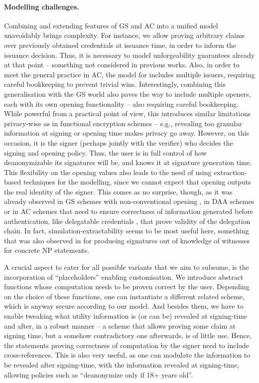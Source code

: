 \paragraph{Modelling challenges.} %
Combining and extending features of GS and AC into a unified model unavoidably
brings complexity. For instance, we allow proving arbitrary claims over
previously obtained credentials at issuance time, in order to inform the
issuance decision. Thus, it is necessary to model unforgeability guarantees
already at that point -- something not considered in previous works. Also, in
order to meet the general practice in AC, the model for \UAS includes multiple
issuers, requiring careful bookkeeping to prevent trivial wins. Interestingly,
combining this generalisation with the GS world also paves the way to
include multiple openers, each with its own opening functionality -- also
requiring careful bookkeeping. While powerful from a practical point of view,
this introduces similar limitations privacy-wise as in functional encryption
schemes \cite{bsw11} -- e.g., revealing too granular information at signing or
opening time makes privacy go away. However, on this occasion, it is the signer
(perhaps jointly with the verifier) who decides the signing and
opening policy. Thus, the user is in full control of how deanonymizable its
signatures will be, and knows it at signature generation time. This flexibility
on the opening values also leads to the
need of using extraction-based techniques for the modelling, since we cannot
expect that opening outputs the real identity of the signer. This comes as no
surprise, though, as it was already observed in GS schemes with non-conventional
opening \cite{dl21}, in DAA schemes \cite{cdl16,cdl16b} or in AC schemes that
need to ensure correctness of information generated before authentication, like
delegatable credentials \cite{bcc+09}, that prove validity of the delegation
chain. In fact, simulation-extractability seems to be most useful here,
something that was also observed in \cite{cl06} for producing signatures out of
knowledge of witnesses for concrete NP statements.

A crucial aspect to cater for all possible variants that we aim to subsume, is
the incorporation of ``placeholders'' enabling customisation. We introduce abstract
functions whose computation needs to be proven correct by the user. Depending on
the choice of these functions, one can instantiate a different related scheme,
which is anyway secure according to our \UAS model. And
besides them, we have to enable tweaking what utility information is (or can be)
revealed at signing-time and after, in a robust manner -- a scheme that allows
proving some claim at signing time, but a somehow contradictory one afterwards,
is of little use. Hence, the statements proving correctness of computation by
the signer need to include cross-references. This is also very useful, as one
can modulate the information to be revealed after signing-time, with the
information revealed at signing-time, allowing policies such as ``deanonymize
only if 18+ years old''.

